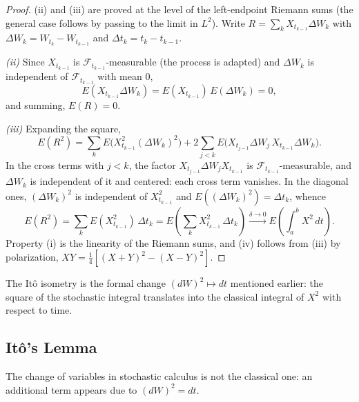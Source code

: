 \documentclass[11pt, a4paper]{article}
\begin{document}
\begin{proof}
(ii) and (iii) are proved at the level of the left-endpoint Riemann sums (the
general case follows by passing to the limit in $L^2$). Write $R = \sum_k X_{t_{k-1}} \Delta W_k$ with
$\Delta W_k = W_{t_k} - W_{t_{k-1}}$ and $\Delta t_k = t_k - t_{k-1}$.

\textit{(ii)} Since $X_{t_{k-1}}$ is $\mathcal{F}_{t_{k-1}}$-measurable (the process is adapted) and
$\Delta W_k$ is independent of $\mathcal{F}_{t_{k-1}}$ with mean $0$,
$$ E(X_{t_{k-1}} \Delta W_k) = E(X_{t_{k-1}}) \, E(\Delta W_k) = 0, $$
and summing, $E(R) = 0$.

\textit{(iii)} Expanding the square,
$$ E(R^2) = \sum_k E\big(X_{t_{k-1}}^2 (\Delta W_k)^2\big) + 2 \sum_{j < k}
E\big(X_{t_{j-1}} \Delta W_j \, X_{t_{k-1}} \Delta W_k\big). $$
In the cross terms with $j < k$, the factor $X_{t_{j-1}} \Delta W_j X_{t_{k-1}}$ is
$\mathcal{F}_{t_{k-1}}$-measurable, and $\Delta W_k$ is independent of it and centered: each
cross term vanishes. In the diagonal ones, $(\Delta W_k)^2$ is independent of
$X_{t_{k-1}}^2$ and $E((\Delta W_k)^2) = \Delta t_k$, whence
$$ E(R^2) = \sum_k E(X_{t_{k-1}}^2) \, \Delta t_k = E\!\left( \sum_k X_{t_{k-1}}^2 \, \Delta
t_k \right) \xrightarrow{\delta \to 0} E\!\left( \int_a^b X^2 \, dt \right). $$
Property (i) is the linearity of the Riemann sums, and (iv) follows from (iii) by
polarization, $XY = \tfrac{1}{4} \left[ (X + Y)^2 - (X - Y)^2 \right]$.
\end{proof}

\obs The Itô isometry is the formal change $(dW)^2 \mapsto dt$ mentioned earlier: the square
of the stochastic integral translates into the classical integral of $X^2$ with respect to time.

\subsection{Itô's Lemma}

The change of variables in stochastic calculus is not the classical one: an additional
term appears due to $(dW)^2 = dt$.
\end{document}
